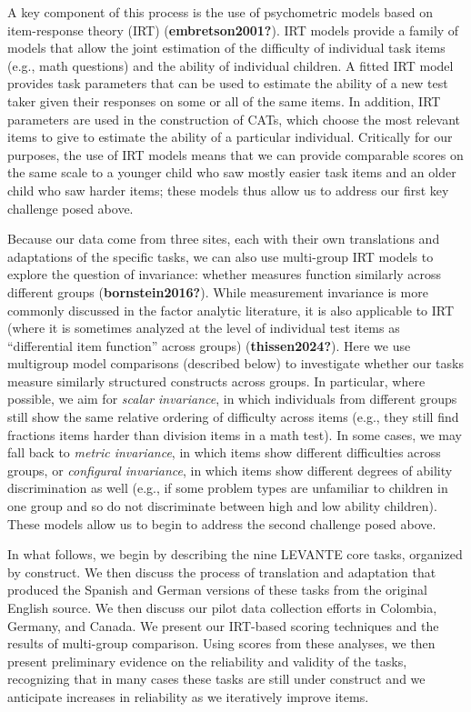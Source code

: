 \documentclass[
  english,
  man]{apa6}
\begin{document}
A key component of this process is the use of psychometric models based on item-response theory (IRT) (\textbf{embretson2001?}). IRT models provide a family of models that allow the joint estimation of the difficulty of individual task items (e.g., math questions) and the ability of individual children. A fitted IRT model provides task parameters that can be used to estimate the ability of a new test taker given their responses on some or all of the same items. In addition, IRT parameters are used in the construction of CATs, which choose the most relevant items to give to estimate the ability of a particular individual. Critically for our purposes, the use of IRT models means that we can provide comparable scores on the same scale to a younger child who saw mostly easier task items and an older child who saw harder items; these models thus allow us to address our first key challenge posed above.

Because our data come from three sites, each with their own translations and adaptations of the specific tasks, we can also use multi-group IRT models to explore the question of invariance: whether measures function similarly across different groups (\textbf{bornstein2016?}). While measurement invariance is more commonly discussed in the factor analytic literature, it is also applicable to IRT (where it is sometimes analyzed at the level of individual test items as ``differential item function'' across groups) (\textbf{thissen2024?}). Here we use multigroup model comparisons (described below) to investigate whether our tasks measure similarly structured constructs across groups. In particular, where possible, we aim for \emph{scalar invariance}, in which individuals from different groups still show the same relative ordering of difficulty across items (e.g., they still find fractions items harder than division items in a math test). In some cases, we may fall back to \emph{metric invariance}, in which items show different difficulties across groups, or \emph{configural invariance}, in which items show different degrees of ability discrimination as well (e.g., if some problem types are unfamiliar to children in one group and so do not discriminate between high and low ability children). These models allow us to begin to address the second challenge posed above.

In what follows, we begin by describing the nine LEVANTE core tasks, organized by construct. We then discuss the process of translation and adaptation that produced the Spanish and German versions of these tasks from the original English source. We then discuss our pilot data collection efforts in Colombia, Germany, and Canada. We present our IRT-based scoring techniques and the results of multi-group comparison. Using scores from these analyses, we then present preliminary evidence on the reliability and validity of the tasks, recognizing that in many cases these tasks are still under construct and we anticipate increases in reliability as we iteratively improve items.
\end{document}
